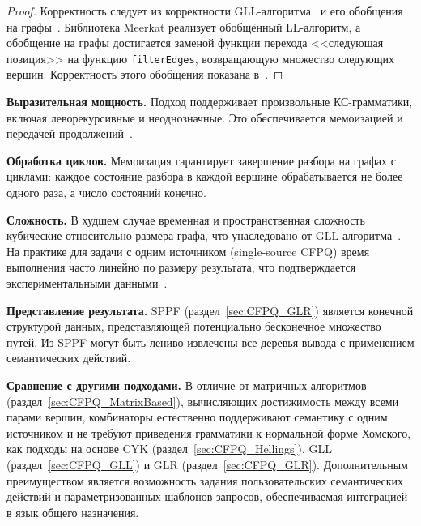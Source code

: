 \begin{proof}
    Корректность следует из корректности GLL-алгоритма~ и его обобщения на графы~.
    Библиотека Meerkat реализует обобщённый LL-алгоритм, а обобщение на графы достигается заменой функции перехода <<следующая позиция>> на функцию \texttt{filterEdges}, возвращающую множество следующих вершин.
    Корректность этого обобщения показана в~.
\end{proof}

\noindent\textbf{Выразительная мощность.}
Подход поддерживает произвольные КС-грамматики, включая леворекурсивные и неоднозначные.
Это обеспечивается мемоизацией и передачей продолжений~.

\medskip
\noindent\textbf{Обработка циклов.}
Мемоизация гарантирует завершение разбора на графах с циклами: каждое состояние разбора в каждой вершине обрабатывается не более одного раза, а число состояний конечно.

\medskip
\noindent\textbf{Сложность.}
В худшем случае временная и пространственная сложность кубические относительно размера графа, что унаследовано от GLL-алгоритма~.
На практике для задачи с одним источником (single-source CFPQ) время выполнения часто линейно по размеру результата, что подтверждается экспериментальными данными~.

\medskip
\noindent\textbf{Представление результата.}
SPPF (раздел~\ref{sec:CFPQ_GLR}) является конечной структурой данных, представляющей потенциально бесконечное множество путей.
Из SPPF могут быть лениво извлечены все деревья вывода с применением семантических действий.

\medskip
\noindent\textbf{Сравнение с другими подходами.}
В отличие от матричных алгоритмов (раздел~\ref{sec:CFPQ_MatrixBased}), вычисляющих достижимость между всеми парами вершин, комбинаторы естественно поддерживают семантику с одним источником и не требуют приведения грамматики к нормальной форме Хомского, как подходы на основе CYK (раздел~\ref{sec:CFPQ_Hellings}), GLL (раздел~\ref{sec:CFPQ_GLL}) и GLR (раздел~\ref{sec:CFPQ_GLR}).
Дополнительным преимуществом является возможность задания пользовательских семантических действий и параметризованных шаблонов запросов, обеспечиваемая интеграцией в язык общего назначения.
